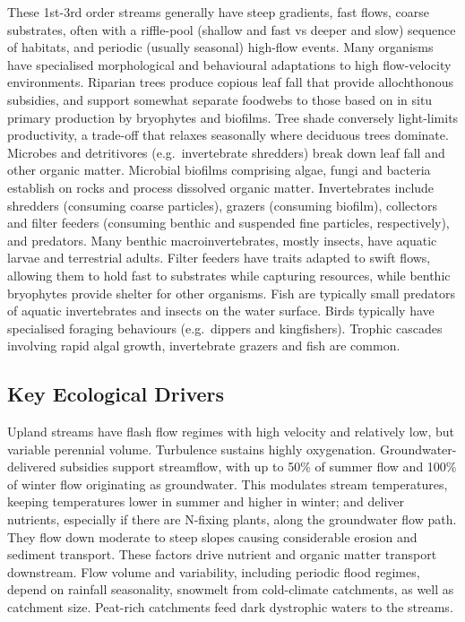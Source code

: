 \documentclass[
  letterpaper,
  DIV=11,
  numbers=noendperiod]{scrartcl}
\begin{document}
These 1st-3rd order streams generally have steep gradients, fast flows,
coarse substrates, often with a riffle-pool (shallow and fast vs deeper
and slow) sequence of habitats, and periodic (usually seasonal)
high-flow events. Many organisms have specialised morphological and
behavioural adaptations to high flow-velocity environments. Riparian
trees produce copious leaf fall that provide allochthonous subsidies,
and support somewhat separate foodwebs to those based on in situ primary
production by bryophytes and biofilms. Tree shade conversely
light-limits productivity, a trade-off that relaxes seasonally where
deciduous trees dominate. Microbes and detritivores (e.g.~invertebrate
shredders) break down leaf fall and other organic matter. Microbial
biofilms comprising algae, fungi and bacteria establish on rocks and
process dissolved organic matter. Invertebrates include shredders
(consuming coarse particles), grazers (consuming biofilm), collectors
and filter feeders (consuming benthic and suspended fine particles,
respectively), and predators. Many benthic macroinvertebrates, mostly
insects, have aquatic larvae and terrestrial adults. Filter feeders have
traits adapted to swift flows, allowing them to hold fast to substrates
while capturing resources, while benthic bryophytes provide shelter for
other organisms. Fish are typically small predators of aquatic
invertebrates and insects on the water surface. Birds typically have
specialised foraging behaviours (e.g.~dippers and kingfishers). Trophic
cascades involving rapid algal growth, invertebrate grazers and fish are
common.

\subsection{Key Ecological Drivers}\label{key-ecological-drivers}

Upland streams have flash flow regimes with high velocity and relatively
low, but variable perennial volume. Turbulence sustains highly
oxygenation. Groundwater-delivered subsidies support streamflow, with up
to 50\% of summer flow and 100\% of winter flow originating as
groundwater. This modulates stream temperatures, keeping temperatures
lower in summer and higher in winter; and deliver nutrients, especially
if there are N-fixing plants, along the groundwater flow path. They flow
down moderate to steep slopes causing considerable erosion and sediment
transport. These factors drive nutrient and organic matter transport
downstream. Flow volume and variability, including periodic flood
regimes, depend on rainfall seasonality, snowmelt from cold-climate
catchments, as well as catchment size. Peat-rich catchments feed dark
dystrophic waters to the streams.
\end{document}
